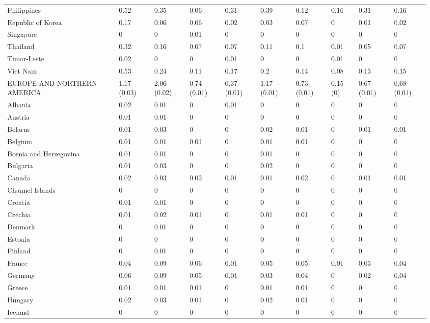 \begin{longtable}[t]{llllllllll}
Philippines & 0.52 & 0.35 & 0.06 & 0.31 & 0.39 & 0.12 & 0.16 & 0.31 & 0.16\\
Republic of Korea & 0.17 & 0.06 & 0.06 & 0.02 & 0.03 & 0.07 & 0 & 0.01 & 0.02\\
Singapore & 0 & 0 & 0.01 & 0 & 0 & 0 & 0 & 0 & 0\\
Thailand & 0.32 & 0.16 & 0.07 & 0.07 & 0.11 & 0.1 & 0.01 & 0.05 & 0.07\\
Timor-Leste & 0.02 & 0 & 0 & 0.01 & 0 & 0 & 0.01 & 0 & 0\\
Viet Nam & 0.53 & 0.24 & 0.11 & 0.17 & 0.2 & 0.14 & 0.08 & 0.13 & 0.15\\
EUROPE AND NORTHERN AMERICA & 1.17 (0.03) & 2.06 (0.02) & 0.74 (0.01) & 0.37 (0.01) & 1.17 (0.01) & 0.73 (0.01) & 0.15 (0) & 0.67 (0.01) & 0.68 (0.01)\\
Albania & 0.02 & 0.01 & 0 & 0.01 & 0 & 0 & 0 & 0 & 0\\
Austria & 0.01 & 0.01 & 0 & 0 & 0 & 0 & 0 & 0 & 0\\
Belarus & 0.01 & 0.03 & 0 & 0 & 0.02 & 0.01 & 0 & 0.01 & 0.01\\
Belgium & 0.01 & 0.01 & 0.01 & 0 & 0.01 & 0.01 & 0 & 0 & 0\\
Bosnia and Herzegovina & 0.01 & 0.01 & 0 & 0 & 0.01 & 0 & 0 & 0 & 0\\
Bulgaria & 0.01 & 0.03 & 0 & 0 & 0.02 & 0 & 0 & 0 & 0\\
Canada & 0.02 & 0.03 & 0.02 & 0.01 & 0.01 & 0.02 & 0 & 0.01 & 0.01\\
Channel Islands & 0 & 0 & 0 & 0 & 0 & 0 & 0 & 0 & 0\\
Croatia & 0.01 & 0.01 & 0 & 0 & 0 & 0 & 0 & 0 & 0\\
Czechia & 0.01 & 0.02 & 0.01 & 0 & 0.01 & 0.01 & 0 & 0 & 0\\
Denmark & 0 & 0.01 & 0 & 0 & 0 & 0 & 0 & 0 & 0\\
Estonia & 0 & 0 & 0 & 0 & 0 & 0 & 0 & 0 & 0\\
Finland & 0 & 0.01 & 0 & 0 & 0 & 0 & 0 & 0 & 0\\
France & 0.04 & 0.09 & 0.06 & 0.01 & 0.05 & 0.05 & 0.01 & 0.03 & 0.04\\
Germany & 0.06 & 0.09 & 0.05 & 0.01 & 0.03 & 0.04 & 0 & 0.02 & 0.04\\
Greece & 0.01 & 0.01 & 0.01 & 0 & 0.01 & 0.01 & 0 & 0 & 0\\
Hungary & 0.02 & 0.03 & 0.01 & 0 & 0.02 & 0.01 & 0 & 0 & 0\\
Iceland & 0 & 0 & 0 & 0 & 0 & 0 & 0 & 0 & 0\\

\end{longtable}
